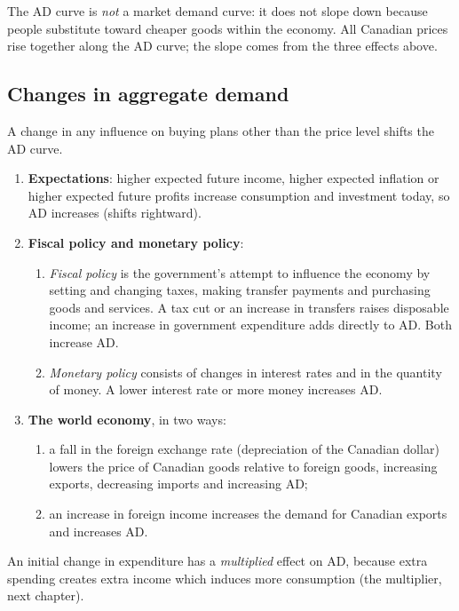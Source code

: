 \begin{important}[Pitfall]
The AD curve is \emph{not} a market demand curve: it does not slope down because people
substitute toward cheaper goods within the economy. All Canadian prices rise together
along the AD curve; the slope comes from the three effects above.
\end{important}

\subsection{Changes in aggregate demand}

A change in any influence on buying plans other than the price level shifts the AD curve.
\begin{enumerate}
  \item \textbf{Expectations}: higher expected future income, higher expected inflation
        or higher expected future profits increase consumption and investment today, so AD
        increases (shifts rightward).
  \item \textbf{Fiscal policy and monetary policy}:
        \begin{enumerate}
          \item \emph{Fiscal policy} is the government's attempt to influence the economy
                by setting and changing taxes, making transfer payments and purchasing
                goods and services. A tax cut or an increase in transfers raises
                disposable income; an increase in government expenditure adds directly to
                AD. Both increase AD.
          \item \emph{Monetary policy} consists of changes in interest rates and in the
                quantity of money. A lower interest rate or more money increases AD.
        \end{enumerate}
  \item \textbf{The world economy}, in two ways:
        \begin{enumerate}
          \item a fall in the foreign exchange rate (depreciation of the Canadian dollar)
                lowers the price of Canadian goods relative to foreign goods, increasing
                exports, decreasing imports and increasing AD;
          \item an increase in foreign income increases the demand for Canadian exports
                and increases AD.
        \end{enumerate}
\end{enumerate}
An initial change in expenditure has a \emph{multiplied} effect on AD, because extra
spending creates extra income which induces more consumption (the multiplier, next
chapter).

